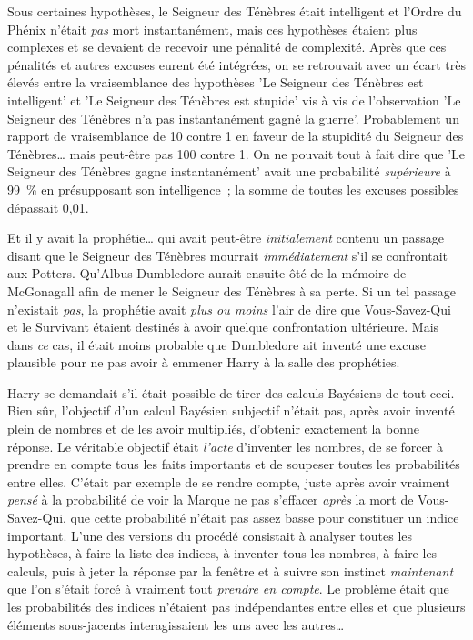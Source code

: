Sous certaines hypothèses, le Seigneur des Ténèbres était intelligent et l'Ordre du Phénix n'était \emph{pas} mort instantanément, mais ces hypothèses étaient plus complexes et se devaient de recevoir une pénalité de complexité. Après que ces pénalités et autres excuses eurent été intégrées, on se retrouvait avec un écart très élevés entre la vraisemblance des hypothèses 'Le Seigneur des Ténèbres est intelligent' et 'Le Seigneur des Ténèbres est stupide' vis à vis de l'observation 'Le Seigneur des Ténèbres n'a pas instantanément gagné la guerre'. Probablement un rapport de vraisemblance de 10 contre 1 en faveur de la stupidité du Seigneur des Ténèbres… mais peut-être pas 100 contre 1. On ne pouvait tout à fait dire que 'Le Seigneur des Ténèbres gagne instantanément' avait une probabilité \emph{supérieure} à 99~\% en présupposant son intelligence~; la somme de toutes les excuses possibles dépassait 0,01.

Et il y avait la prophétie… qui avait peut-être \emph{initialement} contenu un passage disant que le Seigneur des Ténèbres mourrait \emph{immédiatement} s'il se confrontait aux Potters. Qu'Albus Dumbledore aurait ensuite ôté de la mémoire de McGonagall afin de mener le Seigneur des Ténèbres à sa perte. Si un tel passage n'existait \emph{pas}, la prophétie avait \emph{plus ou moins} l'air de dire que Vous-Savez-Qui et le Survivant étaient destinés à avoir quelque confrontation ultérieure. Mais dans \emph{ce} cas, il était moins probable que Dumbledore ait inventé une excuse plausible pour ne pas avoir à emmener Harry à la salle des prophéties.

Harry se demandait s'il était possible de tirer des calculs Bayésiens de tout ceci. Bien sûr, l'objectif d'un calcul Bayésien subjectif n'était pas, après avoir inventé plein de nombres et de les avoir multipliés, d'obtenir exactement la bonne réponse. Le véritable objectif était \emph{l'acte} d'inventer les nombres, de se forcer à prendre en compte tous les faits importants et de soupeser toutes les probabilités entre elles. C'était par exemple de se rendre compte, juste après avoir vraiment \emph{pensé} à la probabilité de voir la Marque ne pas s'effacer \emph{après} la mort de Vous-Savez-Qui, que cette probabilité n'était pas assez basse pour constituer un indice important. L'une des versions du procédé consistait à analyser toutes les hypothèses, à faire la liste des indices, à inventer tous les nombres, à faire les calculs, puis à jeter la réponse par la fenêtre et à suivre son instinct \emph{maintenant} que l'on s'était forcé à vraiment tout \emph{prendre en compte}. Le problème était que les probabilités des indices n'étaient pas indépendantes entre elles et que plusieurs éléments sous-jacents interagissaient les uns avec les autres…

